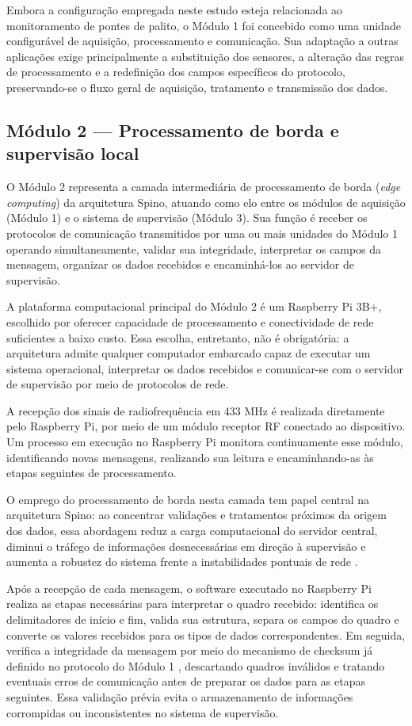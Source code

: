 \documentclass[conference]{IEEEtran}
\begin{document}
Embora a configuração empregada neste estudo esteja relacionada
ao monitoramento de pontes de palito, o Módulo 1 foi concebido
como uma unidade configurável de aquisição, processamento e
comunicação. Sua adaptação a outras aplicações exige
principalmente a substituição dos sensores, a alteração das regras
de processamento e a redefinição dos campos específicos do
protocolo, preservando-se o fluxo geral de aquisição, tratamento e
transmissão dos dados.

\subsection{Módulo 2 --- Processamento de borda e supervisão local}
O Módulo 2 representa a camada intermediária de processamento de borda (\textit{edge computing}) da arquitetura Spino, atuando como elo entre os módulos de aquisição (Módulo 1) e o sistema de supervisão (Módulo 3). Sua função é receber os protocolos de comunicação transmitidos por uma ou mais unidades do Módulo 1 operando simultaneamente, validar sua integridade, interpretar os campos da mensagem, organizar os dados recebidos e encaminhá-los ao servidor de supervisão.

A plataforma computacional principal do Módulo 2 é um Raspberry Pi 3B+, escolhido por oferecer capacidade de processamento e conectividade de rede suficientes a baixo custo. Essa escolha, entretanto, não é obrigatória: a arquitetura admite qualquer computador embarcado capaz de executar um sistema operacional, interpretar os dados recebidos e comunicar-se com o servidor de supervisão por meio de protocolos de rede.

A recepção dos sinais de radiofrequência em 433 MHz é realizada diretamente pelo Raspberry Pi, por meio de um módulo receptor RF conectado ao dispositivo. Um processo em execução no Raspberry Pi monitora continuamente esse módulo, identificando novas mensagens, realizando sua leitura e encaminhando-as às etapas seguintes de processamento.

O emprego do processamento de borda nesta camada tem papel central na arquitetura Spino: ao concentrar validações e tratamentos próximos da origem dos dados, essa abordagem reduz a carga computacional do servidor central, diminui o tráfego de informações desnecessárias em direção à supervisão e aumenta a robustez do sistema frente a instabilidades pontuais de rede \cite{shi2016}.

Após a recepção de cada mensagem, o software executado no Raspberry Pi realiza as etapas necessárias para interpretar o quadro recebido: identifica os delimitadores de início e fim, valida sua estrutura, separa os campos do quadro e converte os valores recebidos para os tipos de dados correspondentes. Em seguida, verifica a integridade da mensagem por meio do mecanismo de checksum já definido no protocolo do Módulo 1 \cite{tanenbaum2011}, descartando quadros inválidos e tratando eventuais erros de comunicação antes de preparar os dados para as etapas seguintes. Essa validação prévia evita o armazenamento de informações corrompidas ou inconsistentes no sistema de supervisão. 
\end{document}
